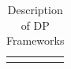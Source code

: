 \begin{longtable}{| p{} | p{} |}
    \hline
  \caption{Description of DP Frameworks \cite{zhang2023evaluation}}
  \label{tab:frameworksDP}
\end{longtable}



